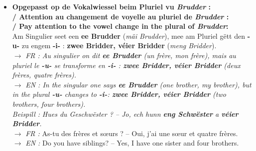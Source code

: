 \begin{itemize}
    \item \textbf{Opgepasst op de Vokalwiessel beim Pluriel vu \textit{Brudder} : \\
    / Attention au changement de voyelle au pluriel de \textit{Brudder} : \\
    / Pay attention to the vowel change in the plural of \textit{Brudder}:} \\
    Am Singulier seet een \textbf{ee Brudder} (\textit{mäi Brudder}), mee am Pluriel gëtt den \textbf{-u-} zu engem \textbf{-i-} : \textbf{zwee Bridder, véier Bridder} (\textit{meng Bridder}). \\
    $\rightarrow$ \textit{FR : Au singulier on dit \textbf{ee Brudder} (un frère, mon frère), mais au pluriel le \textbf{-u-} se transforme en \textbf{-i-} : \textbf{zwee Bridder, véier Bridder} (deux frères, quatre frères).} \\
    $\rightarrow$ \textit{EN : In the singular one says \textbf{ee Brudder} (one brother, my brother), but in the plural \textbf{-u-} changes to \textbf{-i-}: \textbf{zwee Bridder, véier Bridder} (two brothers, four brothers).} \\
    \textit{Beispill :} \textit{Hues du Geschwëster ? -- Jo, ech hunn \textbf{eng Schwëster} a \textbf{véier Bridder}.} \\
    $\rightarrow$ \textit{FR :} As-tu des frères et sœurs ? -- Oui, j'ai une sœur et quatre frères. \\
    $\rightarrow$ \textit{EN :} Do you have siblings? -- Yes, I have one sister and four brothers.

    \vspace{0.4em}


\end{itemize}
